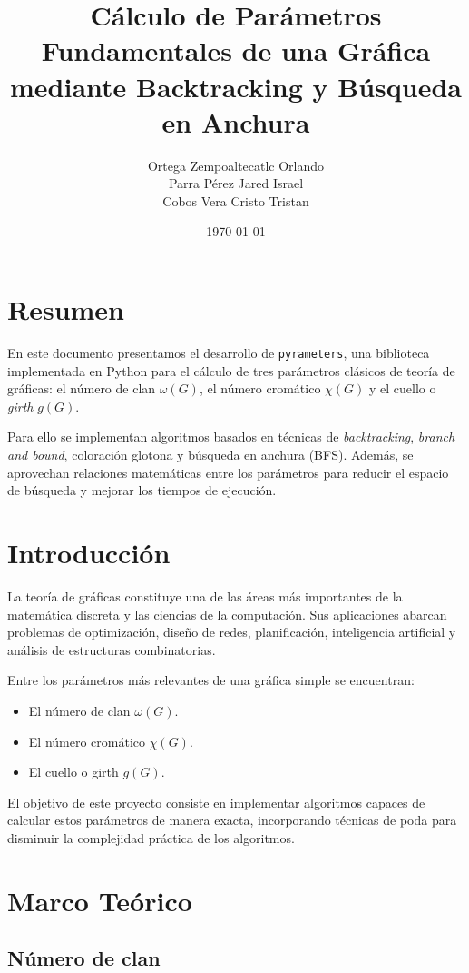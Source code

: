 \documentclass[12pt]{article}
\title{Cálculo de Parámetros Fundamentales de una Gráfica mediante Backtracking y Búsqueda en Anchura}
\author{
Ortega Zempoaltecatlc Orlando \\
Parra Pérez Jared Israel \\
Cobos Vera Cristo Tristan
}
\date{\today}
\begin{document}
\maketitle

\section{Resumen}

En este documento presentamos el desarrollo de \texttt{pyrameters}, una biblioteca
implementada en Python para el cálculo de tres parámetros clásicos de teoría de gráficas:
el número de clan $\omega(G)$, el número cromático $\chi(G)$ y el cuello o \emph{girth}
$g(G)$.

Para ello se implementan algoritmos basados en técnicas de \emph{backtracking},
\emph{branch and bound}, coloración glotona y búsqueda en anchura (BFS). Además,
se aprovechan relaciones matemáticas entre los parámetros para reducir el espacio
de búsqueda y mejorar los tiempos de ejecución.

\section{Introducción}

La teoría de gráficas constituye una de las áreas más importantes de la matemática
discreta y las ciencias de la computación. Sus aplicaciones abarcan problemas de
optimización, diseño de redes, planificación, inteligencia artificial y análisis de
estructuras combinatorias.

Entre los parámetros más relevantes de una gráfica simple se encuentran:

\begin{itemize}
    \item El número de clan $\omega(G)$.
    \item El número cromático $\chi(G)$.
    \item El cuello o girth $g(G)$.
\end{itemize}

El objetivo de este proyecto consiste en implementar algoritmos capaces de calcular
estos parámetros de manera exacta, incorporando técnicas de poda para disminuir
la complejidad práctica de los algoritmos.

\section{Marco Teórico}

\subsection{Número de clan}
\end{document}
